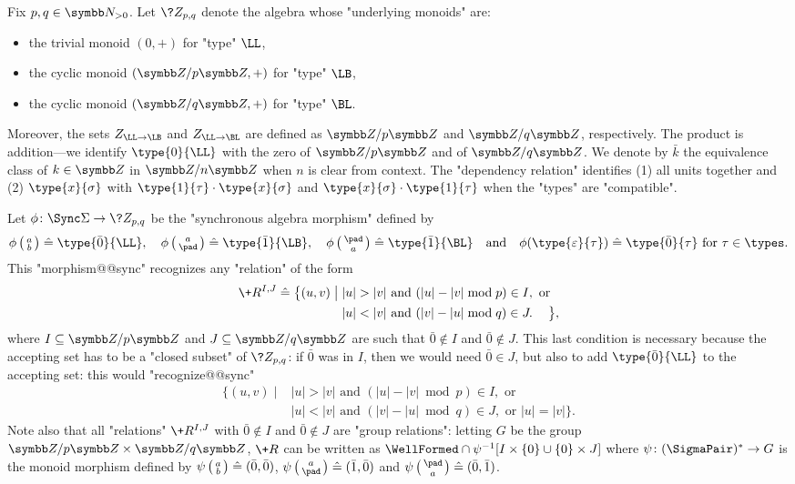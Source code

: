 \begin{example}
	\label{ex:algebra-Zpq}
	Fix $p,q \in \N_{>0}$. Let $\?Z_{p,q}$ denote the algebra whose "underlying monoids" are:
	\begin{itemize}
		\item the trivial monoid $(0,+)$ for "type" $\LL$,
		\item the cyclic monoid $(\Z/p\Z,+)$ for "type" $\LB$,
		\item the cyclic monoid $(\Z/q\Z,+)$ for "type" $\BL$.
	\end{itemize}
	Moreover, the sets $Z_{\LL\to\LB}$ and $Z_{\LL\to\BL}$ are defined
	as $\Z/p\Z$ and $\Z/q\Z$, respectively.
	The product is addition---we identify $\type{0}{\LL}$ with the zero of $\Z/p\Z$ and
	of $\Z/q\Z$. We denote by $\bar k$ the equivalence class of $k\in \Z$ in
	$\Z/n\Z$ when $n$ is clear from context.
	The "dependency relation" identifies (1) all units together and (2) $\type{x}{\sigma}$ with $\type{1}{\tau} \cdot \type{x}{\sigma}$ and $\type{x}{\sigma} \cdot \type{1}{\tau}$ when the "types" are "compatible".
	
	Let $\phi\colon \Sync\Sigma \to \?Z_{p,q}$ be the "synchronous algebra morphism"
	defined by
	\[
		\phi \pair{a}{b} \defeq  \type{\bar 0}{\LL}, 
		\quad
		\phi \pair{a}{\pad} \defeq \type{\bar 1}{\LB},
		\quad
		\phi \pair{\pad}{a} \defeq \type{\bar 1}{\BL}
		\quad\text{and}\quad
		\phi(\type{\varepsilon}{\tau}) \defeq \type{\bar 0}{\tau}
		\text{ for $\tau \in \types$}.
	\]
	This "morphism@@sync" recognizes any "relation" of the form 
	\begin{align*}
		\+R^{I,J} \defeq \big\{
			(u,v) \;\big\vert\; & |u| > |v| \text{ and } (|u| - |v| \bmod{p}) \in I, \text{ or} \\
			& |u| < |v| \text{ and } (|v| - |u| \bmod{q}) \in J.
		\hphantom{\text{ or}}\big\},
	\end{align*}
	where $I \subseteq \Z/p\Z$ and $J \subseteq \Z/q\Z$ are such that $\bar 0 \not\in I$
	and $\bar 0 \not\in J$. This last condition is necessary because the accepting set
	has to be a "closed subset" of $\?Z_{p,q}$: if $\bar 0$ was in $I$, then we would need
	$\bar 0 \in J$, but also to add $\type{\bar 0}{\LL}$ to the accepting set: this would "recognize@@sync"
	\begin{align*}
		\big\{
			(u,v) \;\big\vert\; & |u| > |v| \text{ and } (|u| - |v| \bmod{p}) \in I, \text{ or} \\
			& |u| < |v| \text{ and } (|v| - |u| \bmod{q}) \in J, \text{ or } |u| = |v| \big\}.
	\end{align*}
	Note also that all "relations" $\+R^{I,J}$ with $\bar 0 \not\in I$
	and $\bar 0 \not\in J$ are "group relations": letting $G$ be the group $\Z/p\Z \times \Z/q\Z$,
	$\+R$ can be written as $\WellFormed\cap \psi^{-1}[I \times \{0\} \cup \{0\} \times J]$ where $\psi \colon (\SigmaPair)^* \to G$ is the monoid morphism defined by $\psi\pair{a}{b} \defeq 
	(\bar 0, \bar 0)$, $\psi\pair{a}{\pad} \defeq (\bar 1, \bar 0)$ and $\psi\pair{\pad}{a} \defeq
	(\bar 0, \bar 1)$.
\end{example}


